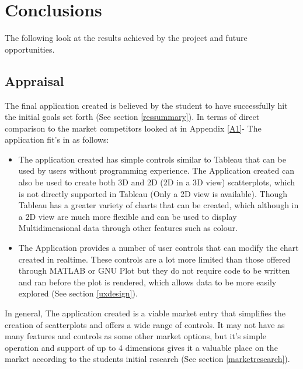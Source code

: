 \section{Conclusions}
The following look at the results achieved by the project and future opportunities.

\subsection{Appraisal}
The final application created is believed by the student to have successfully hit the initial goals set forth (See section \ref{ressummary}). In terms of direct comparison to the market competitors looked at in Appendix \ref{A1}- The application fit's in as follows:
\begin{itemize}
    \item The application created has simple controls similar to Tableau that can be used by users without programming experience. The Application created can also be used to create both 3D and 2D (2D in a 3D view) scatterplots, which is not directly supported in Tableau (Only a 2D view is available). Though Tableau has a greater variety of charts that can be created, which although in a 2D view are much more flexible and can be used to display Multidimensional data through other features such as colour.
    \item The Application provides a number of user controls that can modify the chart created in realtime. These controls are a lot more limited than those offered through MATLAB or GNU Plot but they do not require code to be written and ran before the plot is rendered, which allows data to be more easily explored (See section \ref{uxdesign}).
\end{itemize}

In general, The application created is a viable market entry that simplifies the creation of scatterplots and offers a wide range of controls. It may not have as many features and controls as some other market options, but it's simple operation and support of up to 4 dimensions gives it a valuable place on the market according to the students initial research (See section \ref{marketresearch}).

